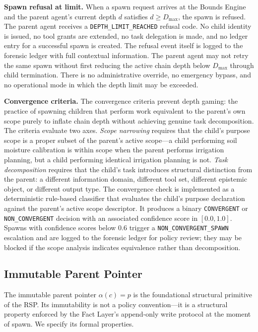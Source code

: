 \textbf{Spawn refusal at limit.} When a spawn request arrives at the Bounds Engine and the parent agent's current depth $d$ satisfies $d \geq D_{\max}$, the spawn is refused. The parent agent receives a \texttt{DEPTH\_LIMIT\_REACHED} refusal code. No child identity is issued, no tool grants are extended, no task delegation is made, and no ledger entry for a successful spawn is created. The refusal event itself is logged to the forensic ledger with full contextual information. The parent agent may not retry the same spawn without first reducing the active chain depth below $D_{\max}$ through child termination. There is no administrative override, no emergency bypass, and no operational mode in which the depth limit may be exceeded.

\textbf{Convergence criteria.} The convergence criteria prevent depth gaming: the practice of spawning children that perform work equivalent to the parent's own scope purely to inflate chain depth without achieving genuine task decomposition. The criteria evaluate two axes. \textit{Scope narrowing} requires that the child's purpose scope is a proper subset of the parent's active scope—a child performing soil moisture calibration is within scope when the parent performs irrigation planning, but a child performing identical irrigation planning is not. \textit{Task decomposition} requires that the child's task introduces structural distinction from the parent: a different information domain, different tool set, different epistemic object, or different output type. The convergence check is implemented as a deterministic rule-based classifier that evaluates the child's purpose declaration against the parent's active scope descriptor. It produces a binary \texttt{CONVERGENT} or \texttt{NON\_CONVERGENT} decision with an associated confidence score in $[0.0, 1.0]$. Spawns with confidence scores below $0.6$ trigger a \texttt{NON\_CONVERGENT\_SPAWN} escalation and are logged to the forensic ledger for policy review; they may be blocked if the scope analysis indicates equivalence rather than decomposition.

\subsection{Immutable Parent Pointer}

The immutable parent pointer $\alpha(c) = p$ is the foundational structural primitive of the RSP. Its immutability is not a policy convention—it is a structural property enforced by the Fact Layer's append-only write protocol at the moment of spawn. We specify its formal properties.

